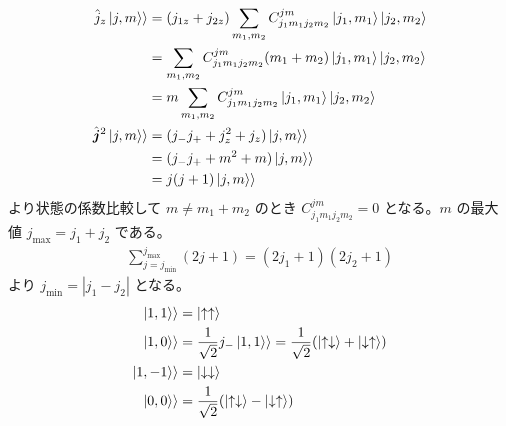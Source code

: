 \documentclass[uplatex,dvipdfmx,a4paper,11pt]{jlreq}
\theoremstyle{definition}
\begin{document}
\begin{align}
  \hat{j}_z\ket{j, m}\rangle      & = (j_{1z} + j_{2z})\sum_{m_1, m_2}C_{j_1m_1j_2m_2}^{jm}\ket{j_1, m_1}\ket{j_2, m_2} \\
                                  & = \sum_{m_1, m_2}C_{j_1m_1j_2m_2}^{jm}(m_1 + m_2)\ket{j_1, m_1}\ket{j_2, m_2}       \\
                                  & = m\sum_{m_1, m_2}C_{j_1m_1j_2m_2}^{jm}\ket{j_1, m_1}\ket{j_2, m_2}                 \\
  \hat{\bm{j}}^2\ket{j, m}\rangle & = (j_-j_+ + j_z^2 + j_z)\ket{j, m}\rangle                                           \\
                                  & = (j_-j_+ + m^2 + m)\ket{j, m}\rangle                                               \\
                                  & = j(j + 1)\ket{j, m}\rangle
\end{align}
より状態の係数比較して $m \neq m_1 + m_2$ のとき $C_{j_1m_1j_2m_2}^{jm} = 0$ となる。$m$ の最大値 $j_{\max} = j_1 + j_2$ である。
\begin{align}
  \sum_{j=j_{\min}}^{j_{\max}} (2j + 1) = (2j_1 + 1)(2j_2 + 1)
\end{align}
より $j_{\min} = |j_1 - j_2|$ となる。
\begin{align}
  \ket{1, 1}\rangle  & = \ket{\uparrow\uparrow}                                                                                               \\
  \ket{1, 0}\rangle  & = \frac{1}{\sqrt{2}}j_-\ket{1, 1}\rangle = \frac{1}{\sqrt{2}}\qty(\ket{\uparrow\downarrow} + \ket{\downarrow\uparrow}) \\
  \ket{1, -1}\rangle & = \ket{\downarrow\downarrow}                                                                                           \\
  \ket{0, 0}\rangle  & = \frac{1}{\sqrt{2}}\qty(\ket{\uparrow\downarrow} - \ket{\downarrow\uparrow})
\end{align}
\end{document}

